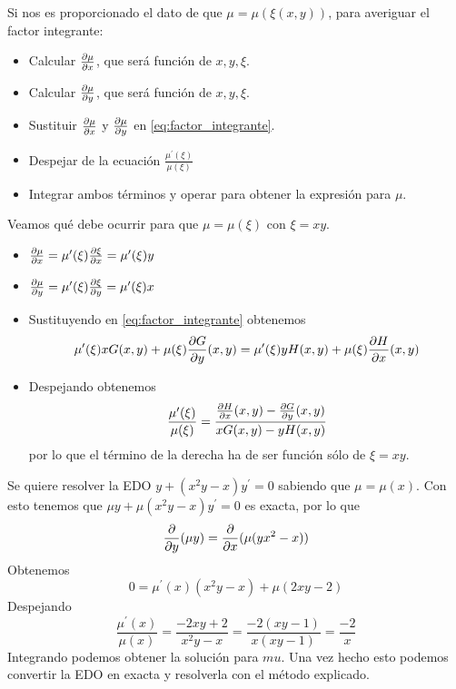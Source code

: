 \begin{method}
Si nos es proporcionado el dato de que $\mu = \mu(\xi(x,y))$, para averiguar el factor integrante:
\begin{itemize}
\item Calcular $\partialder{x}{\mu}$, que será función de $x,y,\xi$.
\item Calcular $\partialder{y}{\mu}$, que será función de $x,y,\xi$.
\item Sustituir $\partialder{x}{\mu}$ y $\partialder{y}{\mu}$ en \ref{eq:factor_integrante}.
\item Despejar de la ecuación $\frac{\mu^\prime(\xi)}{\mu(\xi)}$
\item Integrar ambos términos y operar para obtener la expresión para $\mu$.
\end{itemize}
\end{method}

\begin{example}
Veamos qué debe ocurrir para que $\mu = \mu(\xi)$ con $\xi = xy$.
\begin{itemize}
\item $\partialder{x}{\mu} = \mu^\prime(\xi)\partialder{x}{\xi} = \mu^\prime(\xi)y$
\item $\partialder{y}{\mu} = \mu^\prime(\xi)\partialder{y}{\xi} = \mu^\prime(\xi)x$
\item Sustituyendo en \ref{eq:factor_integrante} obtenemos $$\mu^\prime(\xi)xG(x,y)+\mu(\xi)\partialder{y}{G}(x,y) = \mu^\prime(\xi)yH(x,y)+\mu(\xi)\partialder{x}{H}(x,y)$$
\item Despejando obtenemos $$\frac{\mu^\prime(\xi)}{\mu(\xi)} = \frac{\partialder{x}{H}(x,y)-\partialder{y}{G}(x,y)}{xG(x,y)-yH(x,y)}$$ por lo que el término de la derecha ha de ser función sólo de $\xi=xy$.
\end{itemize}
\end{example}

\begin{example}
Se quiere resolver la EDO $y+(x^2y-x)y^\prime = 0$ sabiendo que $\mu = \mu(x)$. Con esto tenemos que $\mu y +\mu(x^2y-x)y^\prime = 0$ es exacta, por lo que $$\derivative{y}(\mu y) = \derivative{x} (\mu(yx^2-x))$$
Obtenemos $$0 = \mu^\prime(x)(x^2y-x)+\mu(2xy-2)$$
Despejando $$\frac{\mu^\prime(x)}{\mu(x)} = \frac{-2xy+2}{x^2y-x} = \frac{-2(xy-1)}{x(xy-1)} = \frac{-2}{x}$$
Integrando podemos obtener la solución para $mu$. Una vez hecho esto podemos convertir la EDO en exacta y resolverla con el método explicado.
\end{example}

